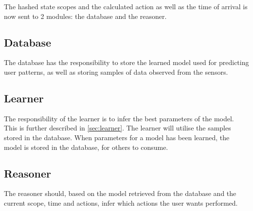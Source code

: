 The hashed state scopes and the calculated action as well as the time of arrival is now sent to 2 modules: the database and the reasoner.

\subsection{Database}
The database has the responsibility to store the learned model used for predicting user patterns, as well as storing samples of data observed from the sensors.

\subsection{Learner}
The responsibility of the learner is to infer the best parameters of the model. This is further described in \cref{sec:learner}. The learner will utilise the samples stored in the database. When parameters for a model has been learned, the model is stored in the database, for others to consume.

\subsection{Reasoner}
The reasoner should, based on the model retrieved from the database and the current scope, time and actions, infer which actions the user wants performed.
